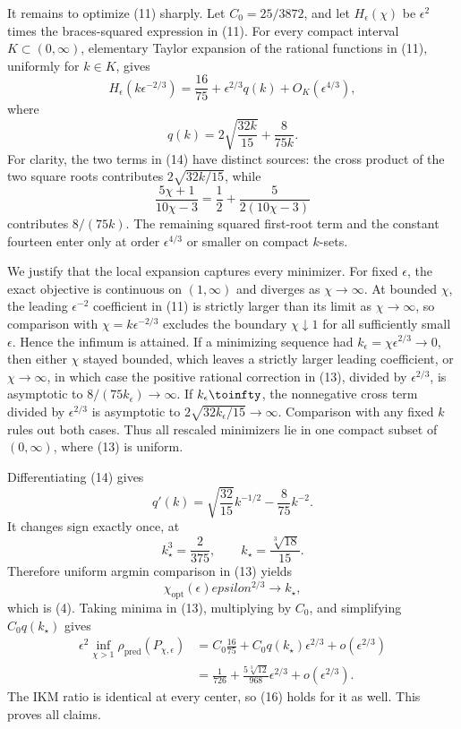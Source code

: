 It remains to optimize (11) sharply.  Let \(C_0=25/3872\), and let \(H_\epsilon(\chi)\) be \(\epsilon^2\) times the braces-squared expression in (11).  For every compact interval \(K\subset(0,\infty)\), elementary Taylor expansion of the rational functions in (11), uniformly for \(k\in K\), gives
\[
 H_\epsilon(k\epsilon^{-2/3})
 =\frac{16}{75}+\epsilon^{2/3}q(k)+O_K(\epsilon^{4/3}), \tag{13}
\]
where
\[
 q(k)=2\sqrt{\frac{32k}{15}}+\frac8{75k}.               \tag{14}
\]
For clarity, the two terms in (14) have distinct sources: the cross product of the two square roots contributes \(2\sqrt{32k/15}\), while
\[
 \frac{5\chi+1}{10\chi-3}
 =\frac12+\frac5{2(10\chi-3)}
\]
contributes \(8/(75k)\).  The remaining squared first-root term and the constant fourteen enter only at order \(\epsilon^{4/3}\) or smaller on compact \(k\)-sets.

We justify that the local expansion captures every minimizer.  For fixed \(\epsilon\), the exact objective is continuous on \((1,\infty)\) and diverges as \(\chi\to\infty\).  At bounded \(\chi\), the leading \(\epsilon^{-2}\) coefficient in (11) is strictly larger than its limit as \(\chi\to\infty\), so comparison with \(\chi=k\epsilon^{-2/3}\) excludes the boundary \(\chi\downarrow1\) for all sufficiently small \(\epsilon\).  Hence the infimum is attained.  If a minimizing sequence had \(k_\epsilon=\chi\epsilon^{2/3}\to0\), then either \(\chi\) stayed bounded, which leaves a strictly larger leading coefficient, or \(\chi\to\infty\), in which case the positive rational correction in (13), divided by \(\epsilon^{2/3}\), is asymptotic to \(8/(75k_\epsilon)\to\infty\).  If \(k_\epsilon\toinfty\), the nonnegative cross term divided by \(\epsilon^{2/3}\) is asymptotic to \(2\sqrt{32k_\epsilon/15}\to\infty\).  Comparison with any fixed \(k\) rules out both cases.  Thus all rescaled minimizers lie in one compact subset of \((0,\infty)\), where (13) is uniform.

Differentiating (14) gives
\[
 q'(k)=\sqrt{\frac{32}{15}}k^{-1/2}-\frac8{75}k^{-2}.
\]
It changes sign exactly once, at
\[
 k_\star^3=\frac2{375},
 \qquad
 k_\star=\frac{\sqrt[3]{18}}{15}.                       \tag{15}
\]
Therefore uniform argmin comparison in (13) yields
\[
 \chi_{\mathrm{opt}}(\epsilon)epsilon^{2/3}\longrightarrow k_\star,
\]
which is (4).  Taking minima in (13), multiplying by \(C_0\), and simplifying \(C_0q(k_\star)\) gives
\[
\begin{aligned}
 \epsilon^2\inf_{\chi>1}\rho_{\mathrm{pred}}(P_{\chi,\epsilon})
 &=C_0\frac{16}{75}+C_0q(k_\star)\epsilon^{2/3}
 +o(\epsilon^{2/3})\\
 &=\frac1{726}+\frac{5\sqrt[3]{12}}{968}\epsilon^{2/3}
 +o(\epsilon^{2/3}).                                    \tag{16}
\end{aligned}
\]
The IKM ratio is identical at every center, so (16) holds for it as well.  This proves all claims.